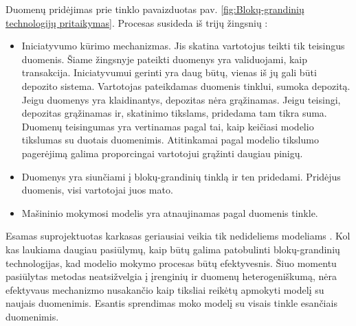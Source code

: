 \documentclass{VUMIFInfBakalaurinis}
\begin{document}
\par Duomenų pridėjimas prie tinklo pavaizduotas pav. \ref{fig:Blokų-grandinių technologijų pritaikymas}. Procesas susideda iš trijų žingsnių \cite{25}:
\begin{itemize}
    \item Iniciatyvumo kūrimo mechanizmas. Jis skatina vartotojus teikti tik teisingus duomenis. Šiame žingsnyje pateikti duomenys yra validuojami, kaip transakcija. Iniciatyvumui gerinti yra daug būtų, vienas iš jų gali būti depozito sistema. Vartotojas pateikdamas duomenis tinklui, sumoka depozitą. Jeigu duomenys yra klaidinantys, depozitas nėra grąžinamas. Jeigu teisingi, depozitas grąžinamas ir, skatinimo tikslams, pridedama tam tikra suma. Duomenų teisingumas yra vertinamas pagal tai, kaip keičiasi modelio tikslumas su duotais duomenimis. Atitinkamai pagal modelio tikslumo pagerėjimą galima proporcingai vartotojui grąžinti daugiau pinigų.
    \item Duomenys yra siunčiami į blokų-grandinių tinklą ir ten pridedami. Pridėjus duomenis, visi vartotojai juos mato.
    \item Mašininio mokymosi modelis yra atnaujinamas pagal duomenis tinkle.
\end{itemize}
\par Esamas suprojektuotas karkasas geriausiai veikia tik nedideliems modeliams \cite{25}. Kol kas laukiama daugiau pasiūlymų, kaip būtų galima patobulinti blokų-grandinių technologijas, kad modelio mokymo procesas būtų efektyvesnis. Šiuo momentu pasiūlytas metodas neatsižvelgia į įrenginių ir duomenų heterogeniškumą, nėra efektyvaus mechanizmo nusakančio kaip tiksliai reikėtų apmokyti modelį su naujais duomenimis. Esantis sprendimas moko modelį su visais tinkle esančiais duomenimis. 
\end{document}
